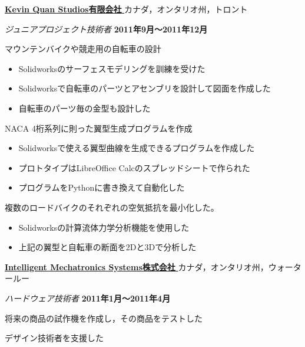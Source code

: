 \documentclass[10pt, a4paper]{article}
\def\xeCJKembold{0.15}
\def\saveCJKnode{\dimen255\lastkern}
\def\restoreCJKnode{\kern-\dimen255\kern\dimen255}
\let\CJKoldsymbol\CJKsymbol
\let\CJKoldpunctsymbol\CJKpunctsymbol
\def\CJKfakeboldsymbol#1{%
\special{pdf:literal direct 2 Tr \xeCJKembold\space w}%
\CJKoldsymbol{#1}%
\saveCJKnode
\special{pdf:literal direct 0 Tr}%
\restoreCJKnode}
\def\CJKfakeboldpunctsymbol#1{%
\special{pdf:literal direct 2 Tr \xeCJKembold\space w}%
\CJKoldpunctsymbol{#1}%
\saveCJKnode
\special{pdf:literal direct 0 Tr}%
\restoreCJKnode}
\newcommand\CJKfakebold[1]{%
\let\CJKsymbol\CJKfakeboldsymbol
\let\CJKpunctsymbol\CJKfakeboldpunctsymbol
#1%
\let\CJKsymbol\CJKoldsymbol
\let\CJKpunctsymbol\CJKoldpunctsymbol}
\begin{document}
\halfblankline

\href{http://www.kqbikes.com/}{\CJKfakebold{\textbf{Kevin Quan Studios有限会社}}}\hfill カナダ，オンタリオ州，トロント

\begin{outerlist}
\item[] \textit{ジュニアプロジェクト技術者} \hfill \textbf{2011年9月〜2011年12月}
  \begin{innerlist}
  \item マウンテンバイクや競走用の自転車の設計
  \begin{itemize}
    \item Solidworksのサーフェスモデリングを訓練を受けた
    \item Solidworksで自転車のパーツとアセンブリを設計して図面を作成した
    \item 自転車のパーツ毎の金型も設計した
  \end{itemize}
  \item NACA 4桁系列に則った翼型生成プログラムを作成
  \begin{itemize}
    \item Solidworksで使える翼型曲線を生成できるプログラムを作成した
    \item プロトタイプはLibreOffice Calcのスプレッドシートで作られた
    \item プログラムをPythonに書き換えて自動化した
  \end{itemize}
  \item 複数のロードバイクのそれぞれの空気抵抗を最小化した。
  \begin{itemize}
    \item Solidworksの計算流体力学分析機能を使用した
    \item 上記の翼型と自転車の断面を2Dと3Dで分析した
  \end{itemize}
  \end{innerlist}
\end{outerlist}

\halfblankline

\href{http://www.intellimec.com/}{\CJKfakebold{\textbf{Intelligent Mechatronics Systems株式会社}}}\hfill カナダ，オンタリオ州，ウォータールー

\begin{outerlist}
\item[] \textit{ハードウェア技術者} \hfill \textbf{2011年1月〜2011年4月}
  \begin{innerlist}
  \item 将来の商品の試作機を作成し，その商品をテストした
  \item デザイン技術者を支援した
  \end{innerlist}
\end{outerlist}
\end{document}
